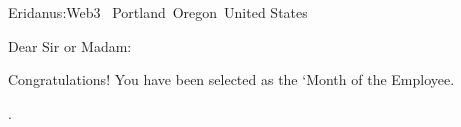 \documentclass{letter}
\begin{document}
\begin{letter}{Eridanus:Web3 \ Portland\ Oregon\ United States}
\opening{Dear Sir or Madam:}

Congratulations! You have been selected as the ‘Month of the Employee.

\closing{.}

\end{letter}
\end{document}
